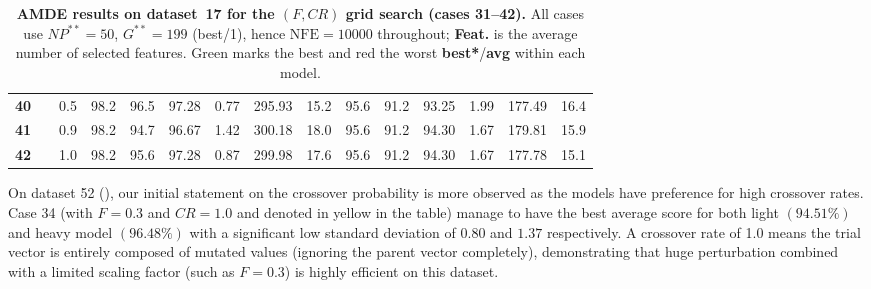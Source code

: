 \documentclass[12pt, openany]{article}
\begin{document}
\begin{table}[H]
{\begin{tabular}{|c c c | c c c c c c | c c c c c c |}
        \textbf{40} &  & 0.5 & \cellcolor{best}98.2 & 96.5 & 97.28 & 0.77 & 295.93 & 15.2 & 95.6 & 91.2 & \cellcolor{worst}93.25 & 1.99 & 177.49 & 16.4 \\
        \textbf{41} &  & 0.9 & \cellcolor{best}98.2 & 94.7 & 96.67 & 1.42 & 300.18 & 18.0 & 95.6 & 91.2 & 94.30 & 1.67 & 179.81 & 15.9 \\
        \textbf{42} &  & 1.0 & \cellcolor{best}98.2 & 95.6 & 97.28 & 0.87 & 299.98 & 17.6 & 95.6 & 91.2 & 94.30 & 1.67 & 177.78 & 15.1 \\
        \hline
    \end{tabular}
    }
    \caption{\textbf{AMDE results on dataset~17 for the $(F, CR)$ grid search (cases 31--42).} All cases use $NP^{**}{=}50$, $G^{**}{=}199$ (best/1), hence $\mathrm{NFE}=10000$ throughout; \textbf{Feat.} is the average number of selected features. Green marks the best and red the worst \textbf{best*}/\textbf{avg} within each model.}
    \label{tab:results_AMDE_FCR_d17}
\end{table}

On dataset 52 (), our initial statement on the crossover probability is more observed as the models have preference for high crossover rates. Case 34 (with $F=0.3$ and $CR=1.0$ and denoted in yellow in the table) manage to have the best average score for both light $(94.51\%)$ and heavy model $(96.48\%)$ with a significant low standard deviation of $0.80$ and $1.37$ respectively. A crossover rate of 1.0 means the trial vector is entirely composed of mutated values (ignoring the parent vector completely), demonstrating that huge perturbation combined with a limited scaling factor (such as $F=0.3$) is highly efficient on this dataset.
\end{document}
